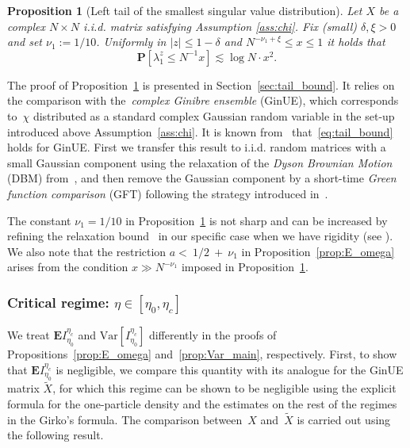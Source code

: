 \documentclass[10pt]{amsart}
\newtheorem{proposition}[theorem]{Proposition}
\numberwithin{equation}{section}
\newcommand{\E}{\mathbf{E}}
\newcommand{\Var}{\mathrm{Var}}
\begin{document}
\begin{proposition}[Left tail of the smallest singular value distribution]\label{prop:tail_bound} Let $X$ be a complex $N\times N$ i.i.d. matrix satisfying Assumption \ref{ass:chi}. Fix (small) $\delta,\xi>0$ and set $\nu_1:=1/10$. Uniformly in $|z|\le 1-\delta$ and $N^{-\nu_1+\xi}\le x\le 1$ it holds that
\begin{equation}
\mathbf{P}\left[ \lambda_1^z \le N^{-1}x\right] \lesssim \log N\cdot x^2.
\label{eq:tail_bound}
\end{equation}
\end{proposition}
The proof of Proposition~\ref{prop:tail_bound} is presented in Section~\ref{sec:tail_bound}. It relies on the comparison with the~\emph{complex Ginibre ensemble} (GinUE), which corresponds to~$\chi$ distributed as a standard complex Gaussian random variable in the set-up introduced above Assumption~\ref{ass:chi}. It is known from~\cite[Corollary~2.4]{least_sing_val_Ginibre} that~\eqref{eq:tail_bound} holds for GinUE. First we transfer this result to i.i.d. random matrices with a small Gaussian component using the relaxation of the \emph{Dyson Brownian Motion} (DBM) from~\cite[Proposition~4.6]{bourgade2024fluctuations}, and then remove the Gaussian component by a short-time \emph{Green function comparison} (GFT) following the strategy introduced in~\cite{EYY12}.

The constant $\nu_1=1/10$ in Proposition~\ref{prop:tail_bound} is not sharp and can be increased by refining the relaxation bound~\cite[Proposition~4.6]{bourgade2024fluctuations} in our specific case when we have rigidity (see \cite[Remark 4.19]{bourgade2024fluctuations}). We also note that the restriction $a<~\! 1/2~\!+~\!\nu_1$ in Proposition~\ref{prop:E_omega} arises from the condition $x\gg N^{-\nu_1}$ imposed in Proposition~\ref{prop:tail_bound}. 

\subsubsection{Critical regime: $\eta\in [\eta_0,\eta_c]$}\label{sec:interm_eta} We treat $\E I_{\eta_0}^{\eta_c}$ and $\Var\left[ I_{\eta_0}^{\eta_c}\right]$ differently in the proofs of Propositions~\ref{prop:E_omega} and~\ref{prop:Var_main}, respectively. First, to show that $\E I_{\eta_0}^{\eta_c}$ is negligible, we compare this quantity with its analogue for the GinUE matrix $\widetilde{X}$, for which this regime can be shown to be negligible using the explicit formula for the one-particle density and the estimates on the rest of the regimes in the Girko's formula. The comparison between~$X$ and~$\widetilde{X}$ is carried out using the following result.
\end{document}
